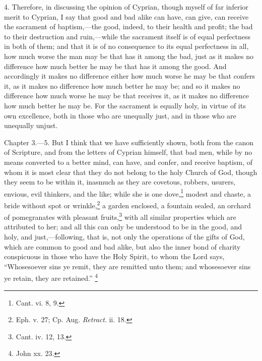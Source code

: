 4. Therefore, in discussing the opinion of Cyprian, though myself of far inferior merit to Cyprian, I say that good and bad alike can have, can give, can receive the sacrament of baptism,—the good, indeed, to their health and profit; the bad to their destruction and ruin,—while the sacrament itself is of equal perfectness in both of them; and that it is of no consequence to its equal perfectness in all, how much worse the man may be that has it among the bad, just as it makes no difference how much better he may be that has it among the good. And accordingly it makes no difference either how much worse he may be that confers it, as it makes no difference how much better he may be; and so it makes no difference how much worse he may be that receives it, as it makes no difference how much better he may be. For the sacrament is equally holy, in virtue of its own excellence, both in those who are unequally just, and in those who are unequally unjust.


Chapter 3.—5. But I think that we have sufficiently shown, both from the canon of Scripture, and from the letters of Cyprian himself, that bad men, while by no means converted to a better mind, can have, and confer, and receive baptism, of whom it is most clear that they do not belong to the holy Church of God, though they seem to be within it, inasmuch as they are covetous, robbers, usurers, envious, evil thinkers, and the like; while she is one dove,\footnote{\par  Cant. vi. 8, 9.} modest and chaste, a bride without spot or wrinkle,\footnote{\par  Eph. v. 27; Cp. Aug. \emph{ Retract}. ii. 18.} a garden enclosed, a fountain sealed, an orchard of pomegranates with pleasant fruits,\footnote{\par  Cant. iv. 12, 13.} with all similar properties which are attributed to her; and all this can only be understood to be in the good, and holy, and just,—following, that is, not only the operations of the gifts of God, which are common to good and bad alike, but also the inner bond of charity conspicuous in those who have the Holy Spirit, to whom the Lord says, ``Whosesoever sins ye remit, they are remitted unto them; and whosesoever sins ye retain, they are retained.'' \footnote{\par  John xx. 23.}


